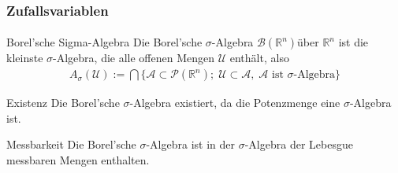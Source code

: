 \documentclass{beamer}
\begin{document}
\begin{frame}
    \frametitle{Zufallsvariablen}
\framesubtitle{}

\begin{block}{Borel'sche Sigma-Algebra}
Die Borel'sche   $\sigma$-Algebra $\mathcal{B}(\mathbb{R}^n)$über $\mathbb{R}^n$ ist die kleinste  $\sigma$-Algebra, die alle offenen Mengen $\mathcal{U}$ enthält, also 
\begin{align*}
A_\sigma (\mathcal{U}) := \bigcap \{  \mathcal{A} \subset \mathcal{P}(\mathbb{R}^n);  \;   \mathcal{U}  \subset  \mathcal{A},  \;  \mathcal{A} \text{ ist $\sigma$-Algebra} \}
\end{align*}
\end{block}

\begin{block}{Existenz}
Die Borel'sche   $\sigma$-Algebra existiert, da die Potenzmenge eine   $\sigma$-Algebra ist.
\end{block}
\begin{block}{Messbarkeit}
    Die Borel'sche   $\sigma$-Algebra ist in der $\sigma$-Algebra der Lebesgue messbaren Mengen enthalten.
    \end{block}
 \end{frame}
\end{document}
